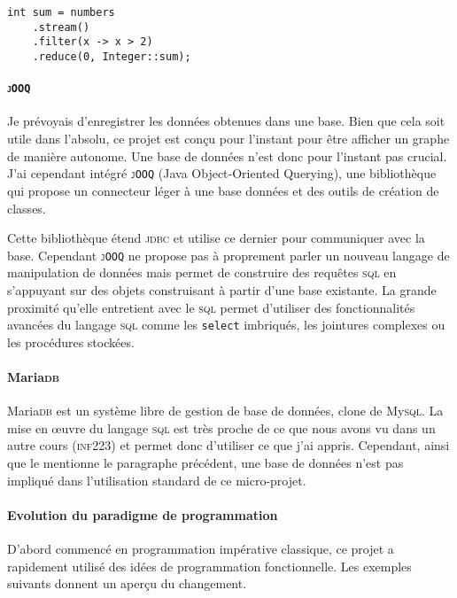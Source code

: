 \documentclass[12pt,onecolumn]{article}
\begin{document}
\begin{lstlisting}[caption={Somme des éléments supérieurs à trois en java 8}]
int sum = numbers
	.stream()
	.filter(x -> x > 2)
	.reduce(0, Integer::sum);
\end{lstlisting}

\paragraph{\texttt{\textsc{jOOQ}}} Je prévoyais d'enregistrer les données obtenues dans une base. Bien que cela soit utile dans l'absolu, ce projet est conçu pour l'instant pour être afficher un graphe de manière autonome. Une base de données n'est donc pour l'instant pas crucial. J'ai cependant intégré \texttt{\textsc{jOOQ}} (Java Object-Oriented Querying), une bibliothèque qui propose un connecteur léger à une base données et des outils de création de classes.

Cette bibliothèque étend \textsc{jdbc} et utilise ce dernier pour communiquer avec la base. Cependant \texttt{\textsc{jOOQ}} ne propose pas à proprement parler un nouveau langage de manipulation de données mais permet de construire des requêtes \textsc{sql} en s'appuyant sur des objets construisant à partir d'une base existante. La grande proximité qu'elle entretient avec le \textsc{sql} permet d'utiliser des fonctionnalités avancées du langage \textsc{sql} comme les \texttt{select} imbriqués, les jointures complexes ou les procédures stockées.

\paragraph{Maria\textsc{db}}

Maria\textsc{db} est un système libre de gestion de base de données, clone de My\textsc{sql}. La mise en œuvre du langage \textsc{sql} est très proche de ce que nous avons vu dans un autre cours (\textsc{inf223}) et permet donc d'utiliser ce que j'ai appris. Cependant, ainsi que le mentionne le paragraphe précédent, une base de données n'est pas impliqué dans l'utilisation standard de ce micro-projet.

\paragraph{Evolution du paradigme de programmation}

D'abord commencé en programmation impérative classique, ce projet a rapidement utilisé des idées de programmation fonctionnelle. Les exemples suivants donnent un aperçu du changement.
\end{document}
